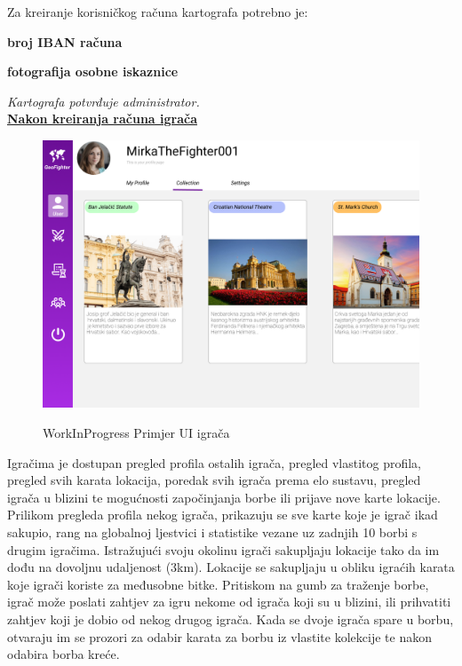 		\noindent\textnormal{Za kreiranje korisničkog računa kartografa potrebno je:}
		\begin{packed_item}
			\item \textbf{broj IBAN računa}
			\item \textbf{fotografija osobne iskaznice}
		\end{packed_item}
		\textit{Kartografa potvrđuje administrator.}\\
		
		\noindent\textbf{\underline{Nakon kreiranja računa igrača}}
		\begin{figure}[H]
			\centering
			\includegraphics[scale=0.2]{slike/example} \\%
			\caption{WorkInProgress Primjer UI igrača}
			\label{fig:example} %
		\end{figure}
		
		
		\textnormal{Igračima je dostupan pregled profila ostalih igrača, pregled vlastitog profila, pregled svih karata lokacija, poredak svih igrača prema elo sustavu, pregled igrača u blizini te mogućnosti započinjanja borbe ili prijave nove karte lokacije. Prilikom pregleda profila nekog igrača, prikazuju se sve karte koje je igrač ikad sakupio, rang na globalnoj ljestvici i statistike vezane uz zadnjih 10 borbi s drugim igračima. Istražujući svoju okolinu igrači sakupljaju lokacije tako da im dođu na dovoljnu udaljenost (3km). Lokacije se sakupljaju u obliku igraćih karata koje igrači koriste za međusobne bitke. Pritiskom na gumb za traženje borbe, igrač može poslati zahtjev za igru nekome od igrača koji su u blizini, ili prihvatiti zahtjev koji je dobio od nekog drugog igrača. Kada se dvoje igrača spare u borbu, otvaraju im se prozori za odabir karata za borbu iz vlastite kolekcije te nakon odabira borba kreće.}\\
		
